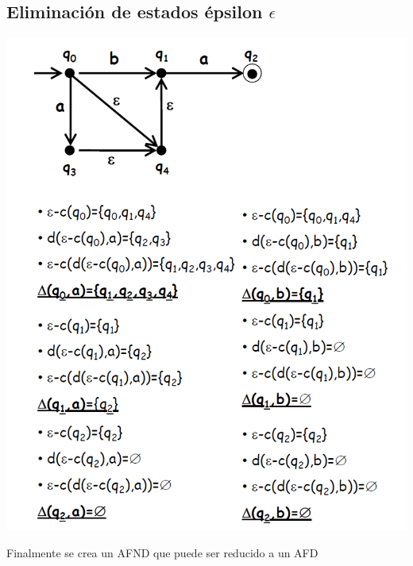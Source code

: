 \documentclass[a4paper,9pt]{extarticle}
\newenvironment{Figure}
  {\par\medskip\noindent\minipage{\linewidth}}
  {\endminipage\par\medskip}
\begin{document}
\begin{multicols*}{2}
\subsection{Eliminación de estados épsilon $\epsilon$}

\begin{Figure}
 \centering
 \includegraphics[scale=0.4]{Eliminar_epsilon}
\end{Figure}

Finalmente se crea un AFND que puede ser reducido a un AFD


\end{multicols*}
\end{document}
